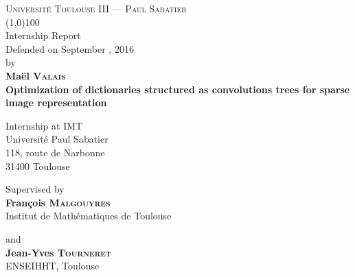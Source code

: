 \begin{titlepage}
\thispagestyle{titlepage}
\begin{center}
\textsc{Université Toulouse III — Paul Sabatier}\\
\vspace{0.5 cm}
\line(1,0){100}\\
\vspace{0.6 cm}
{{{Internship Report}}}\\
\vspace{0.3cm}
Defended on September , 2016\\ \vspace{0.3 cm} by\\ \vspace{0.3 cm} \textbf{Maël \textsc{Valais}}\\
\vfill
{\Huge \textbf{Optimization of dictionaries structured as convolutions trees for sparse image representation }}\\
\vfill

{{Internship at \acs{IMT}}}\\
{Université Paul Sabatier}\\
{118, route de Narbonne}\\
{31400 Toulouse}\\
\vspace{2 cm}

\par Supervised by \\ \textbf{François \textsc{Malgouyres}}\\
Institut de Mathématiques de Toulouse\\ 
\par and \\\textbf{Jean-Yves \textsc{Tourneret}}\\
ENSEIHHT, Toulouse
\end{center}
\end{titlepage}

\pagestyle{empty}
\restoregeometry
\cleardoublepage %

\tableofcontents
{\let\clearpage\relax\listoffigures}
{\let\clearpage\relax\listoftables}
{\let\clearpage\relax\listofalgorithms}

\pagestyle{body}